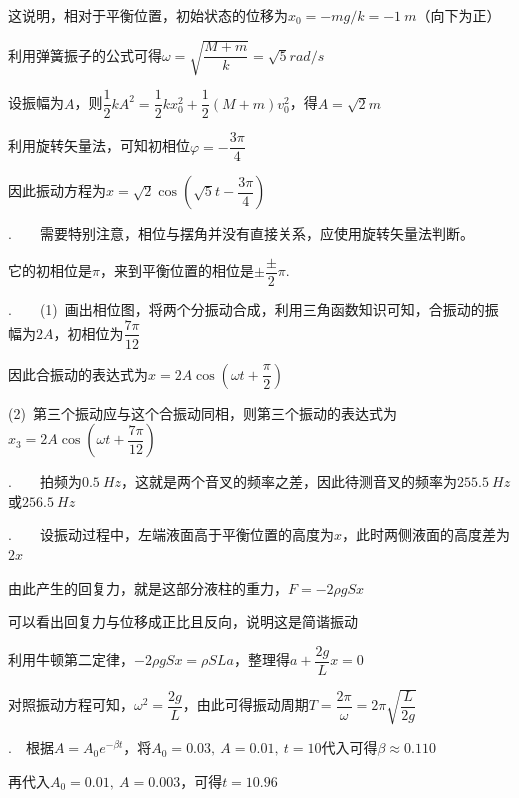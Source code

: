 这说明，相对于平衡位置，初始状态的位移为$x_0=-mg/k=-\SI{1}{m}$（向下为正）

利用弹簧振子的公式可得$\omega=\sqrt{\dfrac{M+m}{k}}=\sqrt{5}\unit{rad/s}$

设振幅为$A$，则$\dfrac{1}{2}kA^2=\dfrac{1}{2}kx_0^2+\dfrac{1}{2}(M+m)v_0^2$，得$A=\sqrt{2}\unit{m}$

利用旋转矢量法，可知初相位$\varphi=-\dfrac{3\pi}{4}$

因此振动方程为$x=\sqrt{2}\cos\left(\sqrt{5}t-\dfrac{3\pi}{4}\right)$

\noindent\hdashrule{\textwidth}{1pt}{1pt}

.~~~~需要特别注意，相位与摆角并没有直接关系，应使用旋转矢量法判断。

它的初相位是$\pi$，来到平衡位置的相位是$\pm\dfrac{\pm}{2}\pi$.

\noindent\hdashrule{\textwidth}{1pt}{1pt}

.~~~~(1)~画出相位图，将两个分振动合成，利用三角函数知识可知，合振动的振幅为$2A$，初相位为$\dfrac{7\pi}{12}$

因此合振动的表达式为$x=2A\cos(\omega t+\dfrac{\pi}{2})$

(2)~第三个振动应与这个合振动同相，则第三个振动的表达式为$x_3=2A\cos(\omega t+\dfrac{7\pi}{12})$

\noindent\hdashrule{\textwidth}{1pt}{1pt}

.~~~~拍频为$\SI{0.5}{Hz}$，这就是两个音叉的频率之差，因此待测音叉的频率为$\SI{255.5}{Hz}$或$\SI{256.5}{Hz}$

\noindent\hdashrule{\textwidth}{1pt}{1pt}

.~~~~设振动过程中，左端液面高于平衡位置的高度为$x$，此时两侧液面的高度差为$2x$

由此产生的回复力，就是这部分液柱的重力，$F=-2\rho gSx$

可以看出回复力与位移成正比且反向，说明这是简谐振动

利用牛顿第二定律，$-2\rho gSx=\rho SLa$，整理得$a+\dfrac{2g}{L}x=0$

对照振动方程可知，$\omega^2=\dfrac{2g}{L}$，由此可得振动周期$T=\dfrac{2\pi}{\omega}=2\pi\sqrt{\dfrac{L}{2g}}$


\newpage

.~~根据$A=A_0 e^{-\beta t}$，将$A_0=0.03,~A=0.01,~t=10$代入可得$\beta\approx 0.110$

再代入$A_0=0.01,~A=0.003$，可得$t=10.96$


